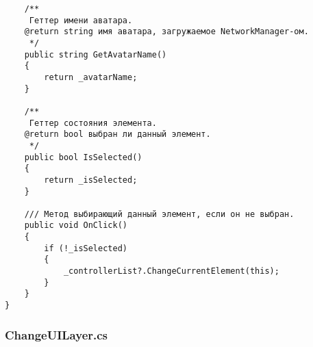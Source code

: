 \begin{verbatim}
    /**
     Геттер имени аватара.
    @return string имя аватара, загружаемое NetworkManager-ом.
     */
    public string GetAvatarName()
    {
        return _avatarName;
    }

    /**
     Геттер состояния элемента.
    @return bool выбран ли данный элемент.
     */
    public bool IsSelected()
    {
        return _isSelected;
    }

    /// Метод выбирающий данный элемент, если он не выбран.
    public void OnClick()
    {
        if (!_isSelected)
        {
            _controllerList?.ChangeCurrentElement(this);
        }
    }
}

\end{verbatim}
\subsubsection*{ChangeUILayer.cs}
